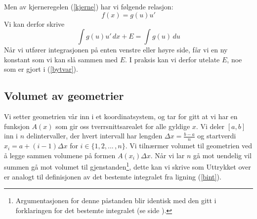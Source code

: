 Men av kjerneregelen (\ref{kjerne}) har vi følgende relasjon:
\[ f(x)= g(u)u'   \]
Vi kan derfor skrive
\[ \int g(u)u' \, dx+E =\int g(u)\, du\]
Når vi utfører integrasjonen på enten venstre eller høyre side, får vi en ny konstant som vi kan slå sammen med $ E $. I praksis kan vi derfor utelate $ E $, noe som er gjort i (\ref{bytvar}).


\subsection*{Volumet av geometrier}
Vi setter geometrien vår inn i et koordinatsystem, og tar for gitt at vi har en funksjon $ A(x) $ som gir oss tverrsnittsarealet for alle gyldige $ x $.
Vi deler $ [a, b] $ inn i $ n $ delintervaller, der hvert intervall har lengden $ {\Delta x=\frac{b-a}{n}} $ og startverdi $ {x_i=a+(i-1)\Delta x}$ for $ {i\in\lbrace 1, 2, ...\, , n\rbrace }$. Vi tilnærmer volumet til geometrien ved å legge sammen volumene på formen $ A(x_i)\Delta x  $. Når vi lar $ n $ gå mot uendelig vil summen gå mot volumet til gjenstanden\footnote{Argumentasjonen for denne påstanden blir identisk med den gitt i forklaringen for det bestemte integralet (se side \pageref{bintforklaring}).}, dette kan vi skrive som
Uttrykket over er analogt til definisjonen av det bestemte integralet fra ligning (\ref{bint}).
